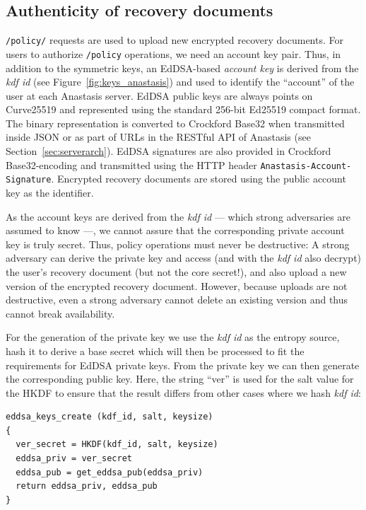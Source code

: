 \subsection{Authenticity of recovery documents}

\texttt{/policy/} requests are used to upload new encrypted recovery
documents. For users to authorize \texttt{/policy} operations, we need
an account key pair.  Thus, in addition to the symmetric keys, an
EdDSA-based {\em account key} is derived from the {\em kdf id} (see
Figure~\ref{fig:keys_anastasis}) and used to identify the ``account''
of the user at each Anastasis server.  EdDSA public keys are always
points on Curve25519 and represented using the standard 256-bit
Ed25519 compact format. The binary representation is converted to
Crockford Base32 when transmitted inside JSON or as part of URLs in
the RESTful API of Anastasis (see Section~\ref{sec:serverarch}).
EdDSA signatures are also provided in Crockford Base32-encoding and
transmitted using the HTTP header
\texttt{Anastasis-Account-Signature}.  Encrypted recovery documents
are stored using the public account key as the identifier.

As the account keys are derived from the {\em kdf id} --- which strong
adversaries are assumed to know ---, we cannot assure that the corresponding
private account key is truly secret. Thus, policy operations must
never be destructive: A strong adversary can derive the private key
and access (and with the {\em kdf id} also decrypt) the user’s
recovery document (but not the core secret!), and also upload a new
version of the encrypted recovery document. However, because uploads
are not destructive, even a strong adversary cannot delete an existing
version and thus cannot break availability.

For the generation of the private key we use the {\em kdf id} as the
entropy source, hash it to derive a base secret which will then be
processed to fit the requirements for EdDSA private keys. From the
private key we can then generate the corresponding public key. Here,
the string “ver” is used for the salt value for the HKDF to ensure
that the result differs from other cases where we hash {\em kdf id}:

\begin{lstlisting}
eddsa_keys_create (kdf_id, salt, keysize)
{
  ver_secret = HKDF(kdf_id, salt, keysize)
  eddsa_priv = ver_secret
  eddsa_pub = get_eddsa_pub(eddsa_priv)
  return eddsa_priv, eddsa_pub
}
\end{lstlisting}

